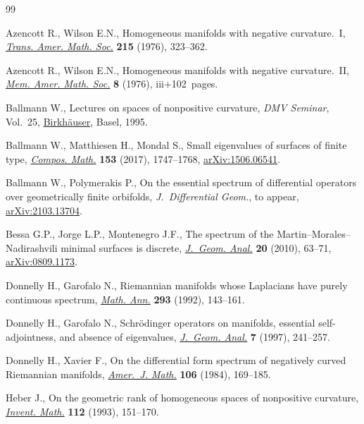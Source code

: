 \begin{thebibliography}{99}
\footnotesize\itemsep=0pt

Azencott R., Wilson E.N., Homogeneous manifolds with negative curvature.~{I},
 \href{https://doi.org/10.2307/1999731}{\textit{Trans. Amer. Math. Soc.}} \textbf{215} (1976), 323--362.

Azencott R., Wilson E.N., Homogeneous manifolds with negative curvature.~{II},
 \href{https://doi.org/10.1090/memo/0178}{\textit{Mem. Amer. Math. Soc.}} \textbf{8} (1976), iii+102~pages.

Ballmann W., Lectures on spaces of nonpositive curvature, \textit{DMV Seminar},
 Vol.~25, \href{https://doi.org/10.1007/978-3-0348-9240-7}{{Birkh\"auser}}, Basel, 1995.

Ballmann W., Matthiesen H., Mondal S., Small eigenvalues of surfaces of finite
 type, \href{https://doi.org/10.1112/S0010437X17007291}{\textit{Compos. Math.}} \textbf{153} (2017), 1747--1768,
 \href{https://arxiv.org/abs/1506.06541}{arXiv:1506.06541}.

Ballmann W., Polymerakis P., On the essential spectrum of differential
 operators over geometrically finite orbifolds, \textit{J.~Differential Geom.},
 {t}o appear, \href{https://arxiv.org/abs/2103.13704}{arXiv:2103.13704}.

Bessa G.P., Jorge L.P., Montenegro J.F., The spectrum of the
 {M}artin--{M}orales--{N}adirashvili minimal surfaces is discrete,
 \href{https://doi.org/10.1007/s12220-009-9101-z}{\textit{J.~Geom. Anal.}} \textbf{20} (2010), 63--71, \href{https://arxiv.org/abs/0809.1173}{arXiv:0809.1173}.

Donnelly H., Garofalo N., Riemannian manifolds whose {L}aplacians have purely
 continuous spectrum, \href{https://doi.org/10.1007/BF01444709}{\textit{Math. Ann.}} \textbf{293} (1992), 143--161.

Donnelly H., Garofalo N., Schr\"odinger operators on manifolds, essential
 self-adjointness, and absence of eigenvalues, \href{https://doi.org/10.1007/BF02921722}{\textit{J.~Geom. Anal.}}
 \textbf{7} (1997), 241--257.

Donnelly H., Xavier F., On the differential form spectrum of negatively curved
 {R}iemannian manifolds, \href{https://doi.org/10.2307/2374434}{\textit{Amer.~J. Math.}} \textbf{106} (1984),
 169--185.

Heber J., On the geometric rank of homogeneous spaces of nonpositive curvature,
 \href{https://doi.org/10.1007/BF01232428}{\textit{Invent. Math.}} \textbf{112} (1993), 151--170.


\end{thebibliography}
